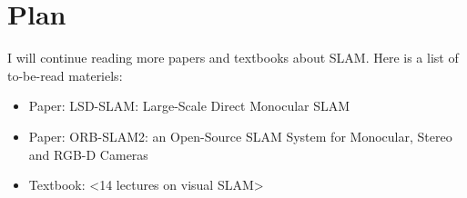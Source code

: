 \documentclass{article}
\begin{document}
    \section{Plan}
    I will continue reading more papers and textbooks about SLAM. Here is a list of to-be-read materiels:
    \begin{itemize}
        \item Paper: LSD-SLAM: Large-Scale Direct Monocular SLAM
        \item Paper: ORB-SLAM2: an Open-Source SLAM System for Monocular, Stereo and RGB-D Cameras
        \item Textbook: <14 lectures on visual SLAM>
    \end{itemize}
    
\end{document}
